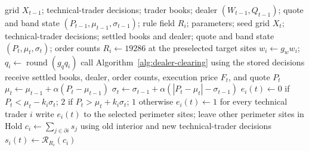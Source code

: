 \begin{algorithm}[!ht]
\caption{One market step, $t-1\rightarrow t$, in simulation order.
Stored decisions generated orders. Clearing determined a common execution
price, and the settled dealer reserves set the new marginal quote.}
\label{alg:model-step}
\begin{algorithmic}[1]
\REQUIRE grid $X_{t-1}$; technical-trader decisions; trader books; dealer
$(W_{t-1},Q_{t-1})$; quote and band state $(P_{t-1},\mu_{t-1},\sigma_{t-1})$;
rule field $R_i$; parameters; seed
\ENSURE grid $X_t$; technical-trader decisions; settled books and dealer;
quote and band state $(P_t,\mu_t,\sigma_t)$; order counts
 \STATE $R_i\leftarrow19286$ at the preselected target sites
\ENDIF
{}
  \STATE $w_i\leftarrow g_w w_i$; $q_i\leftarrow\operatorname{round}(g_q q_i)$
 \ENDFOR
\ENDIF
\STATE call Algorithm~\ref{alg:dealer-clearing} using the stored decisions
\STATE receive settled books, dealer, order counts, execution price $F_t$, and quote $P_t$
\STATE $\mu_t\leftarrow\mu_{t-1}+\alpha(P_t-\mu_{t-1})$
\STATE $\sigma_t\leftarrow\sigma_{t-1}+\alpha(|P_t-\mu_t|-\sigma_{t-1})$
  \STATE $e_i(t)\leftarrow0$ if $P_t<\mu_t-k_i\sigma_t$; $2$ if
  $P_t>\mu_t+k_i\sigma_t$; $1$ otherwise
 \ENDFOR
\ELSE
 \STATE $e_i(t)\leftarrow1$ for every technical trader $i$
\ENDIF
\STATE write $e_i(t)$ to the selected perimeter sites; leave other perimeter sites in Hold
 \STATE $c_i\leftarrow\sum_{j\in\partial i}s_j$ using old interior and new technical-trader decisions
 \STATE $s_i(t)\leftarrow\mathcal{R}_{R_i}(c_i)$
\ENDFOR
\end{algorithmic}
\end{algorithm}

